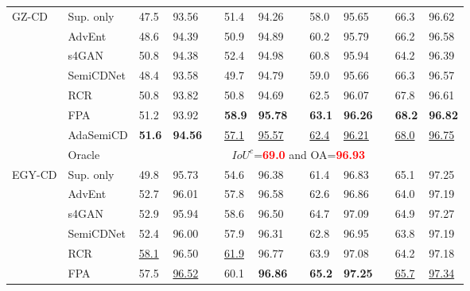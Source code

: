 \documentclass[lang=chs, degree=master, blindreview=false, adobe=false]{yanputhesis}
\begin{document}
\begin{table}[!htbp]
{\begin{tabular}{p{20mm}p{20mm}p{8mm}p{8mm}cp{8mm}p{8mm}cp{8mm}p{8mm}cp{8mm}p{8mm}}
      \bottomrule
      \multirow{8}{*}{GZ-CD}
      & Sup. only   &   47.5 & 93.56 && 51.4 & 94.26 && 58.0 & 95.65 && 66.3 & 96.62 \\ %
      & AdvEnt\cite{vu2019advent}& 48.6 & 94.39 && 50.9 & 94.89 && 60.2 & 95.79 && 66.2 & 96.58 \\ %
      & s4GAN\cite{mittal2019semi}& 50.8 & 94.38 && 52.4 & 94.98 && 60.8 & 95.94 && 64.2 & 96.39 \\
      & SemiCDNet\cite{peng2021SemiCDNet} & 48.4 & 93.58 && 49.7 & 94.79 && 59.0 & 95.66 && 66.3 & 96.57 \\ %
      & RCR\cite{bandara2022RCR}& 50.8 & 93.82 && 50.8 & 94.69 && 62.5 & 96.07 && 67.8 & 96.61 \\
      \rowcolor{mycyan}
      \multirow{-7}{*}{\cellcolor{white}}& \cellcolor{white}
      FPA\cite{Zhang2023FPA}& \cellcolor{white}51.2 & \cellcolor{white}93.92 && \textbf{58.9} & \textbf{95.78} && \textbf{63.1} & \textbf{96.26} && \textbf{68.2} & \textbf{96.82} \\
      \multirow{-8}{*}{\cellcolor{white}}& \cellcolor{white}AdaSemiCD   &   \cellcolor{mycyan}\textbf{51.6} & \cellcolor{mycyan}\textbf{94.56} && \underline{57.1} & \underline{95.57} && \underline{62.4} & \underline{96.21} && \underline{68.0} & \underline{96.75} \\%
      \cline{2-13}
      & Oracle & \multicolumn{11}{c}{$ IoU^c$=\textcolor{red}{\bf 69.0} and OA=\textcolor{red}{\bf 96.93}} \\
      \bottomrule
      \multirow{8}{*}{EGY-CD}
      & Sup. only   &   49.8 & 95.73 && 54.6 & 96.38 && 61.4 & 96.83 && 65.1 & 97.25 \\ %
      & AdvEnt\cite{vu2019advent}& 52.7 & 96.01 && 57.8 & 96.58 && 62.6 & 96.86 && 64.0 & 97.19 \\ %
      & s4GAN\cite{mittal2019semi}& 52.9 & 95.94 && 58.6 & 96.50 && 64.7 & 97.09 && 64.9 & 97.27 \\
      & SemiCDNet\cite{peng2021SemiCDNet} & 52.4 & 96.00 && 57.9 & 96.31 && 62.8 & 96.95 && 63.8 & 97.19 \\ %
      & RCR\cite{bandara2022RCR}& \underline{58.1} & 96.50 && \underline{61.9} & 96.77 && 63.9 & 97.08 && 64.2 & 97.18 \\

      \multirow{-7}{*}{\cellcolor{white}}& \cellcolor{white}
      FPA\cite{Zhang2023FPA}& 57.5 & \underline{96.52} && 60.1 & \cellcolor{mycyan}\textbf{96.86} &\cellcolor{mycyan}& \cellcolor{mycyan}\textbf{65.2} & \cellcolor{mycyan}\textbf{97.25} && \underline{65.7} & \underline{97.34} \\


\end{tabular}}
\end{table}
\end{document}
